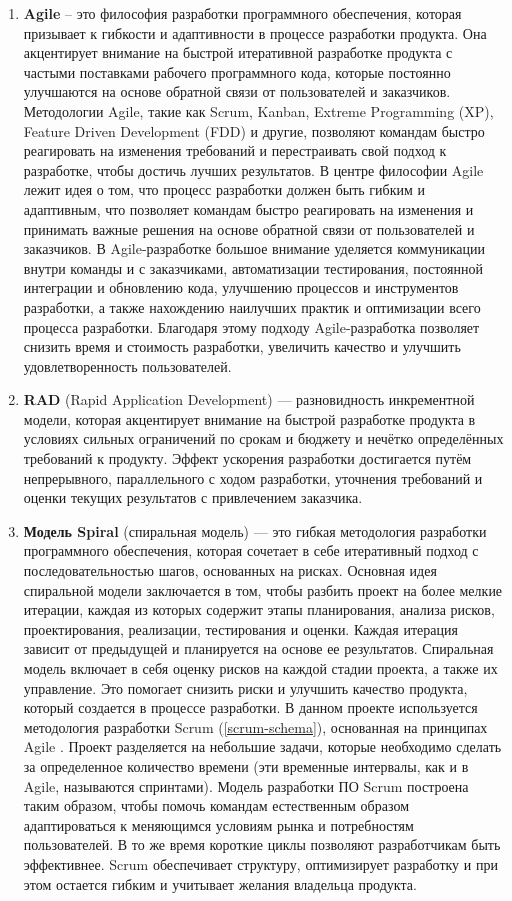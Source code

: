 \begin{enumerate}
	\item \textbf{Agile} – это философия разработки программного обеспечения, которая призывает к гибкости и адаптивности в процессе разработки продукта. Она акцентирует внимание на быстрой итеративной разработке продукта с частыми поставками рабочего программного кода, которые постоянно улучшаются на основе обратной связи от пользователей и заказчиков. Методологии Agile, такие как Scrum, Kanban, Extreme Programming (XP), Feature Driven Development (FDD) и другие, позволяют командам быстро реагировать на изменения требований и перестраивать свой подход к разработке, чтобы достичь лучших результатов. В центре философии Agile лежит идея о том, что процесс разработки должен быть гибким и адаптивным, что позволяет командам быстро реагировать на изменения и принимать важные решения на основе обратной связи от пользователей и заказчиков. В Agile-разработке большое внимание уделяется коммуникации внутри команды и с заказчиками, автоматизации тестирования, постоянной интеграции и обновлению кода, улучшению процессов и инструментов разработки, а также нахождению наилучших практик и оптимизации всего процесса разработки. Благодаря этому подходу Agile-разработка позволяет снизить время и стоимость разработки, увеличить качество и улучшить удовлетворенность пользователей.
	
	\item \textbf{RAD} (Rapid Application Development) — разновидность инкрементной модели, которая акцентирует внимание на быстрой разработке продукта в условиях сильных ограничений по срокам и бюджету и нечётко определённых требований к продукту. Эффект ускорения разработки достигается путём непрерывного, параллельного с ходом разработки, уточнения требований и оценки текущих результатов с привлечением заказчика.
	
	\item \textbf{Модель Spiral} (спиральная модель) — это гибкая методология разработки программного обеспечения, которая сочетает в себе итеративный подход с последовательностью шагов, основанных на рисках. Основная идея спиральной модели заключается в том, чтобы разбить проект на более мелкие итерации, каждая из которых содержит этапы планирования, анализа рисков, проектирования, реализации, тестирования и оценки. Каждая итерация зависит от предыдущей и планируется на основе ее результатов. Спиральная модель включает в себя оценку рисков на каждой стадии проекта, а также их управление. Это помогает снизить риски и улучшить качество продукта, который создается в процессе разработки. В данном проекте используется методология разработки Scrum (\autoref{scrum-schema}), основанная на принципах Agile \cite{best-metod-razr}. Проект разделяется на небольшие задачи, которые необходимо сделать за определенное количество времени (эти временные интервалы, как и в Agile, называются спринтами). Модель разработки ПО Scrum построена таким образом, чтобы помочь командам естественным образом адаптироваться к меняющимся условиям рынка и потребностям пользователей. В то же время короткие циклы позволяют разработчикам быть эффективнее. Scrum обеспечивает структуру, оптимизирует разработку и при этом остается гибким и учитывает желания владельца продукта.
\end{enumerate}


